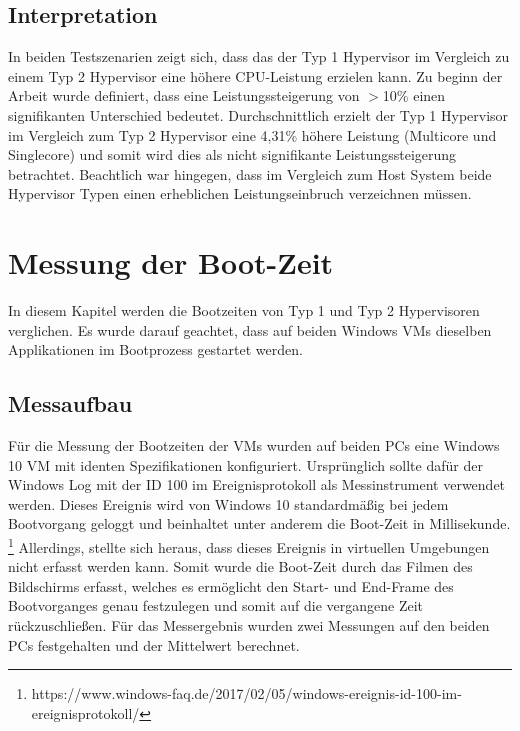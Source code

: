 \documentclass[conference]{IEEEtran}
\begin{document}
\subsection{Interpretation}
In beiden Testszenarien zeigt sich, dass das der Typ 1 Hypervisor im Vergleich zu einem Typ 2 Hypervisor eine höhere CPU-Leistung erzielen kann. Zu beginn der Arbeit wurde definiert, dass eine Leistungssteigerung von $>$10\% einen signifikanten Unterschied bedeutet. Durchschnittlich erzielt der Typ 1 Hypervisor im Vergleich zum Typ 2 Hypervisor eine 4,31\% höhere Leistung (Multicore und Singlecore) und somit wird dies als nicht signifikante Leistungssteigerung betrachtet. Beachtlich war hingegen, dass im Vergleich zum Host System beide Hypervisor Typen einen erheblichen Leistungseinbruch verzeichnen müssen.

\section{Messung der Boot-Zeit}
\label{Messung der Boot-Zeit}
In diesem Kapitel werden die Bootzeiten von Typ 1 und Typ 2 Hypervisoren verglichen. Es wurde darauf geachtet, dass auf beiden Windows VMs dieselben Applikationen im Bootprozess gestartet werden.

\subsection{Messaufbau}
Für die Messung der Bootzeiten der VMs wurden auf beiden PCs eine Windows 10 VM mit identen Spezifikationen konfiguriert. Ursprünglich sollte dafür der Windows Log mit der ID 100 im Ereignisprotokoll als Messinstrument verwendet werden. Dieses Ereignis wird von Windows 10 standardmäßig bei jedem Bootvorgang geloggt und beinhaltet unter anderem die Boot-Zeit in Millisekunde. \footnote{https://www.windows-faq.de/2017/02/05/windows-ereignis-id-100-im-ereignisprotokoll/} Allerdings, stellte sich heraus, dass dieses Ereignis in virtuellen Umgebungen nicht erfasst werden kann. Somit wurde die Boot-Zeit durch das Filmen des Bildschirms erfasst, welches es ermöglicht den Start- und End-Frame des Bootvorganges genau festzulegen und somit auf die vergangene Zeit rückzuschließen. Für das Messergebnis wurden zwei Messungen auf den beiden PCs festgehalten und der Mittelwert berechnet. 
\end{document}
